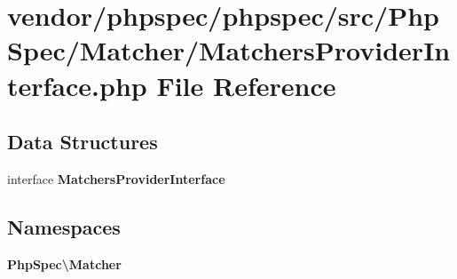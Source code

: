 \section{vendor/phpspec/phpspec/src/\+Php\+Spec/\+Matcher/\+Matchers\+Provider\+Interface.php File Reference}
\label{_matchers_provider_interface_8php}
\subsection*{Data Structures}
\begin{DoxyCompactItemize}
\item 
interface {\bf Matchers\+Provider\+Interface}
\end{DoxyCompactItemize}
\subsection*{Namespaces}
\begin{DoxyCompactItemize}
\item 
 {\bf Php\+Spec\textbackslash{}\+Matcher}
\end{DoxyCompactItemize}

